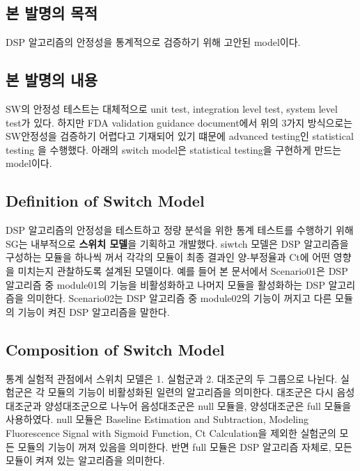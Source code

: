 \documentclass[
  letterpaper,
  DIV=11,
  numbers=noendperiod]{scrartcl}
\begin{document}
\hypertarget{uxbcf8-uxbc1cuxba85uxc758-uxbaa9uxc801}{%
\subsection{본 발명의
목적}\label{uxbcf8-uxbc1cuxba85uxc758-uxbaa9uxc801}}

DSP 알고리즘의 안정성을 통계적으로 검증하기 위해 고안된 model이다.

\hypertarget{uxbcf8-uxbc1cuxba85uxc758-uxb0b4uxc6a9}{%
\subsection{본 발명의
내용}\label{uxbcf8-uxbc1cuxba85uxc758-uxb0b4uxc6a9}}

SW의 안정성 테스트는 대체적으로 unit test, integration level test,
system level test가 있다. 하지만 FDA validation guidance document에서
위의 3가지 방식으로는 SW안정성을 검증하기 어렵다고 기재되어 있기 떄문에
advanced testing인 statistical testing 을 수행했다. 아래의 switch
model은 statistical testing을 구현하게 만드는 model이다.

\hypertarget{definition-of-switch-model}{%
\subsection{Definition of Switch
Model}\label{definition-of-switch-model}}

DSP 알고리즘의 안정성을 테스트하고 정량 분석을 위한 통계 테스트를
수행하기 위해 SG는 내부적으로 \textbf{스위치 모델}을 기획하고 개발했다.
siwtch 모델은 DSP 알고리즘을 구성하는 모듈을 하나씩 꺼서 각각의 모듈이
최종 결과인 양-부정율과 Ct에 어떤 영향을 미치는지 관찰하도록 설계된
모델이다. 예를 들어 본 문서에서 Scenario01은 DSP 알고리즘 중 module01의
기능을 비활성화하고 나머지 모듈을 활성화하는 DSP 알고리즘을 의미한다.
Scenario02는 DSP 알고리즘 중 module02의 기능이 꺼지고 다른 모듈의 기능이
켜진 DSP 알고리즘을 말한다.

\hypertarget{composition-of-switch-model}{%
\subsection{Composition of Switch
Model}\label{composition-of-switch-model}}

통계 실험적 관점에서 스위치 모델은 1. 실험군과 2. 대조군의 두 그룹으로
나뉜다. 실험군은 각 모듈의 기능이 비활성화된 일련의 알고리즘을 의미한다.
대조군은 다시 음성대조군과 양성대조군으로 나누어 음성대조군은 null
모듈을, 양성대조군은 full 모듈을 사용하였다. null 모듈은 Baseline
Estimation and Subtraction, Modeling Fluorescence Signal with Sigmoid
Function, Ct Calculation을 제외한 실험군의 모든 모듈의 기능이 꺼져
있음을 의미한다. 반면 full 모듈은 DSP 알고리즘 자체로, 모든 모듈이 켜져
있는 알고리즘을 의미한다.
\end{document}
